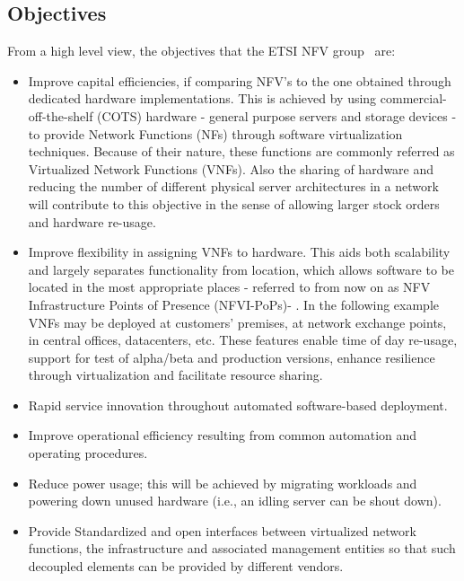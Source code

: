 \subsection{Objectives}
From a high level view, the objectives that the ETSI NFV group~\cite{nfv} are:
\begin{itemize}
	\item Improve capital efficiencies, if comparing NFV's to the one obtained through dedicated hardware implementations. This is achieved by using commercial-off-the-shelf (COTS) hardware - general purpose servers and storage devices - to provide Network Functions (NFs) through software virtualization techniques. Because of their nature, these functions are commonly referred as Virtualized Network Functions (VNFs). Also the sharing of hardware and reducing the number of different physical server architectures in a network will contribute to this objective in the sense of allowing larger stock orders and hardware re-usage.
	\item Improve flexibility in assigning VNFs to hardware. This aids both scalability and largely separates functionality from location, which allows software to be located in the most appropriate places - referred to from now on as NFV Infrastructure Points of Presence (NFVI-PoPs)- . In the following example VNFs may be deployed at customers' premises, at network exchange points, in central offices, datacenters, etc. These features enable time of day re-usage, support for test of alpha/beta and production versions, enhance resilience through virtualization and facilitate resource sharing.
	\item Rapid service innovation throughout automated software-based deployment.
	\item Improve operational efficiency resulting from common automation and operating procedures.
	\item Reduce power usage; this will be achieved by migrating workloads and powering down unused hardware (i.e., an idling server can be shout down).
	\item Provide Standardized and open interfaces between virtualized network functions, the infrastructure and associated management entities so that such decoupled elements can be provided by different vendors.
\end{itemize}

